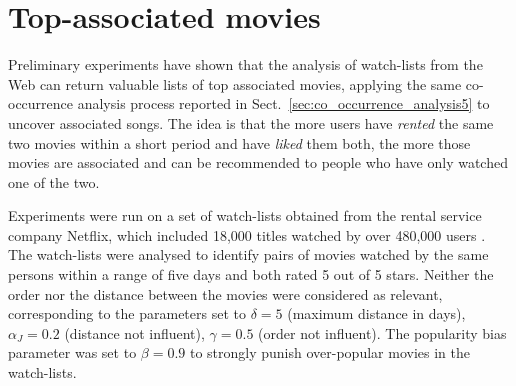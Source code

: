 \documentclass[a4paper,11pt]{memoir}
\makeatletter
\theoremstyle{definition}
\def\thickhrulefill{\leavevmode \leaders \hrule \hfill \kern \z@}
\renewcommand{\@makechapterhead}[1]{\cleardoublepage\thispagestyle{empty}\vspace*{1\p@}%
  {\parindent \z@ \hyphenpenalty=10000 \centering \reset@font
        {\setromanfont{Minister Std Bold}
        \addfontfeature{LetterSpace=23.0}
        \thickhrulefill
        \begin{tabular}{|c|}    
        {\bfseries\uppercase{Chapter \thechapter}}
        \end{tabular}}\thickhrulefill 
        \par\nobreak
        \vspace*{10\p@}%
        \interlinepenalty\@M
        \vspace*{10\p@}%
        \addfontfeature{LetterSpace=14.0}
        \LARGE\uppercase{#1}\par\nobreak
        \par
        \vspace*{5\p@}%
    \vskip 100\p@
  }}
\makeatother
\begin{document}
\appendix
\renewcommand{\@makechapterhead}[1]{\cleardoublepage\thispagestyle{empty}\vspace*{1\p@}%
  {\parindent \z@ \hyphenpenalty=10000 \centering \reset@font
        {\setromanfont{Minister Std Bold}
        \addfontfeature{LetterSpace=23.0}
        \thickhrulefill
        \begin{tabular}{|c|}    
        {\bfseries\uppercase{Appendix \thechapter}}
        \end{tabular}}\thickhrulefill 
        \par\nobreak
        \vspace*{10\p@}%
        \interlinepenalty\@M
        \vspace*{10\p@}%
        \addfontfeature{LetterSpace=14.0}
        \LARGE\uppercase{#1}\par\nobreak
        \par
        \vspace*{5\p@}%
    \vskip 40\p@
  }}


\chapter{Top-associated movies}
\label{cha:appendix}
Preliminary experiments have shown that the analysis of watch-lists from the Web can return valuable lists of top associated movies, applying the same co-occurrence analysis process reported in Sect.~\ref{sec:co_occurrence_analysis5} to uncover associated songs.
The idea is that the more users have \emph{rented} the same two movies within a short period and have \emph{liked} them both, the more those movies are associated and can be recommended to people who have only watched one of the two. %

Experiments were run on a set of watch-lists obtained from the rental service company Netflix, which included 18,000 titles watched by over 480,000 users \cite{Bennett07}.
The watch-lists were analysed to identify pairs of movies watched by the same persons within a range of five days and both rated 5 out of 5 stars. 
Neither the order nor the distance between the movies were considered as relevant, corresponding to the parameters set to $\delta = 5$ (maximum distance in days), $\alpha_J = 0.2$ (distance not influent), $\gamma = 0.5$ (order not influent).
The popularity bias parameter was set to $\beta = 0.9$ to strongly punish over-popular movies in the watch-lists.
\end{document}
